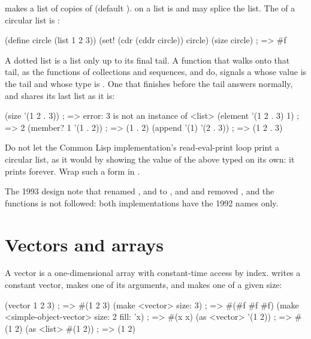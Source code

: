 \noindent {} makes a list
of  copies of  (default ).  on a list
is  and  may splice the list. The 
of a circular list is :

\begin{dylan}
(define circle (list 1 2 3))
(set! (cdr (cddr circle)) circle)
(size circle)    ; => #f
\end{dylan}

\noindent A dotted list is a list only up to its final tail. A function
that walks onto that tail, as the functions of collections and
sequences,  and  do, signals a 
whose value is the tail and whose type is . One that
finishes before the tail answers normally, and  shares its
last list as it is:

\begin{dylan}
(size '(1 2 . 3))           ; => error: 3 is not an instance of <list>
(element '(1 2 . 3) 1)      ; => 2
(member? 1 '(1 . 2))        ; => (1 . 2)
(append '(1) '(2 . 3))      ; => (1 2 . 3)
\end{dylan}

\begin{warnbox}
Do not let the Common Lisp implementation's read-eval-print loop print a
circular list, as it would by showing the value of the  above
typed on its own: it prints forever. Wrap such a form in
.
\end{warnbox}

\noindent The 1993 design note that renamed ,  and
 to ,  and  and removed
,  and the  functions is not
followed: both implementations have the 1992 names only.

\section{Vectors and arrays}\label{sec:collections-vectors}

A vector is a one-dimensional array with constant-time access by index.
 writes a constant vector,  makes one of its
arguments, and  makes one of a given size:

\begin{dylan}
(vector 1 2 3)                                   ; => #(1 2 3)
(make <vector> size: 3)                          ; => #(#f #f #f)
(make <simple-object-vector> size: 2 fill: 'x)   ; => #(x x)
(as <vector> '(1 2))                             ; => #(1 2)
(as <list> #(1 2))                               ; => (1 2)
\end{dylan}

